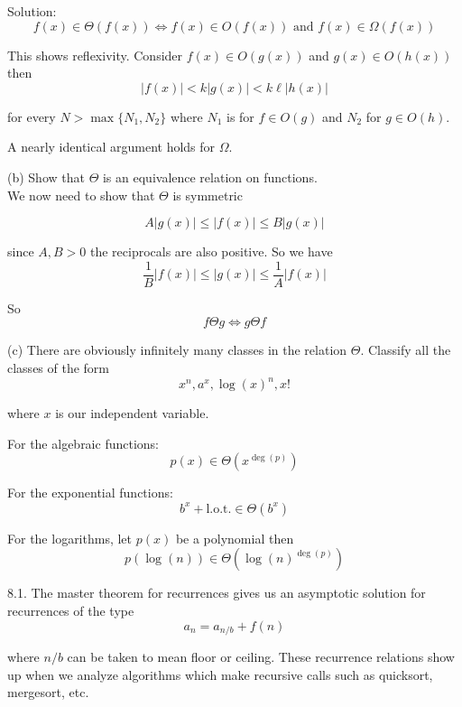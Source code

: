\documentclass[16 pt]{amsart}
\theoremstyle{definition}
\theoremstyle{remark}
\numberwithin{equation}{subsection}
\begin{document}
Solution: 
\[
f(x) \in \Theta(f(x)) \iff f(x)\in O(f(x)) \text{ and } f(x) \in \Omega(f(x))
\]

This shows reflexivity.  Consider $f(x)\in O(g(x))$ and $g(x)\in O(h(x))$ then 
\[
|f(x)| < k |g(x)| < k\ell |h(x)| 
\]

for every $N>\max\{N_1,N_2\}$ where $N_1$ is for $f\in O(g)$ and $N_2$ for $g\in O(h)$.

A nearly identical argument holds for $\Omega$.

(b) Show that $\Theta$ is an equivalence relation on functions.\\

We now need to show that $\Theta$ is symmetric

\[
A|g(x)| \le |f(x)| \le B|g(x)|
\]

since $A,B>0$ the reciprocals are also positive.  So we have
\[
\frac{1}{B} |f(x)| \le |g(x)| \le \frac{1}{A}|f(x)|
\]

So
\[
f\Theta g \iff g\Theta f
\]


(c) There are obviously infinitely many classes in the relation $\Theta$.  Classify all the classes of the form
\[
x^n, a^x, \log(x)^n, x!
\]

where $x$ is our independent variable.


For the algebraic functions:
\[
p(x) \in \Theta(x^{\deg(p)})
\]

For the exponential functions:
\[
b^x + \text{l.o.t.}\in \Theta (b^x)
\]

For the logarithms, let $p(x)$ be a polynomial then
\[
p(\log(n)) \in \Theta(\log(n)^{\deg(p)})
\]





\newpage

8.1. The master theorem for recurrences gives us an asymptotic solution for recurrences of the type
\[
a_n = a_{n/b} + f(n)
\]

where $n/b$ can be taken to mean floor or ceiling.  These recurrence relations show up when we analyze algorithms which make recursive calls such as quicksort, mergesort, etc.  
\end{document}
